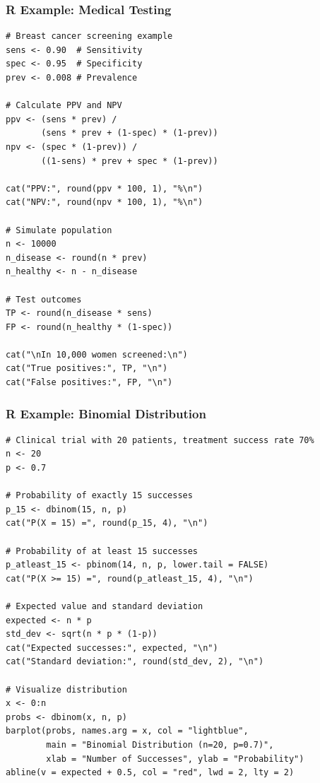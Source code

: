 \documentclass{beamer}
\begin{document}
\begin{frame}[fragile]
\frametitle{R Example: Medical Testing}
\footnotesize
\begin{verbatim}
# Breast cancer screening example
sens <- 0.90  # Sensitivity
spec <- 0.95  # Specificity
prev <- 0.008 # Prevalence

# Calculate PPV and NPV
ppv <- (sens * prev) /
       (sens * prev + (1-spec) * (1-prev))
npv <- (spec * (1-prev)) /
       ((1-sens) * prev + spec * (1-prev))

cat("PPV:", round(ppv * 100, 1), "%\n")
cat("NPV:", round(npv * 100, 1), "%\n")

# Simulate population
n <- 10000
n_disease <- round(n * prev)
n_healthy <- n - n_disease

# Test outcomes
TP <- round(n_disease * sens)
FP <- round(n_healthy * (1-spec))

cat("\nIn 10,000 women screened:\n")
cat("True positives:", TP, "\n")
cat("False positives:", FP, "\n")
\end{verbatim}
\end{frame}

\begin{frame}[fragile]
\frametitle{R Example: Binomial Distribution}
\small
\begin{verbatim}
# Clinical trial with 20 patients, treatment success rate 70%
n <- 20
p <- 0.7

# Probability of exactly 15 successes
p_15 <- dbinom(15, n, p)
cat("P(X = 15) =", round(p_15, 4), "\n")

# Probability of at least 15 successes
p_atleast_15 <- pbinom(14, n, p, lower.tail = FALSE)
cat("P(X >= 15) =", round(p_atleast_15, 4), "\n")

# Expected value and standard deviation
expected <- n * p
std_dev <- sqrt(n * p * (1-p))
cat("Expected successes:", expected, "\n")
cat("Standard deviation:", round(std_dev, 2), "\n")

# Visualize distribution
x <- 0:n
probs <- dbinom(x, n, p)
barplot(probs, names.arg = x, col = "lightblue",
        main = "Binomial Distribution (n=20, p=0.7)",
        xlab = "Number of Successes", ylab = "Probability")
abline(v = expected + 0.5, col = "red", lwd = 2, lty = 2)
\end{verbatim}
\end{frame}
\end{document}
